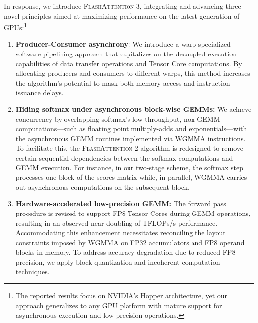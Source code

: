 In response, we introduce \textsc{FlashAttention-3}, integrating and advancing three novel principles aimed at maximizing performance on the latest generation of GPUs:\footnote{The reported results focus on NVIDIA's Hopper architecture, yet our approach generalizes to any GPU platform with mature support for asynchronous execution and low-precision operations.}

\begin{enumerate}

\item \textbf{Producer-Consumer asynchrony:} We introduce a warp-specialized software pipelining approach that capitalizes on the decoupled execution capabilities of data transfer operations and Tensor Core computations. By allocating producers and consumers to different warps, this method increases the algorithm's potential to mask both memory access and instruction issuance delays.
\item \textbf{Hiding softmax under asynchronous block-wise GEMMs:} We achieve concurrency by overlapping softmax's low-throughput, non-GEMM computations—such as floating point multiply-adds and exponentials—with the asynchronous GEMM routines implemented via WGMMA instructions. To facilitate this, the \textsc{FlashAttention-2} algorithm is redesigned to remove certain sequential dependencies between the softmax computations and GEMM execution. For instance, in our two-stage scheme, the softmax step processes one block of the scores matrix while, in parallel, WGMMA carries out asynchronous computations on the subsequent block.
\item \textbf{Hardware-accelerated low-precision GEMM:} The forward pass procedure is revised to support FP8 Tensor Cores during GEMM operations, resulting in an observed near doubling of TFLOPs/s performance. Accommodating this enhancement necessitates reconciling the layout constraints imposed by WGMMA on FP32 accumulators and FP8 operand blocks in memory. To address accuracy degradation due to reduced FP8 precision, we apply block quantization and incoherent computation techniques.
\end{enumerate}

